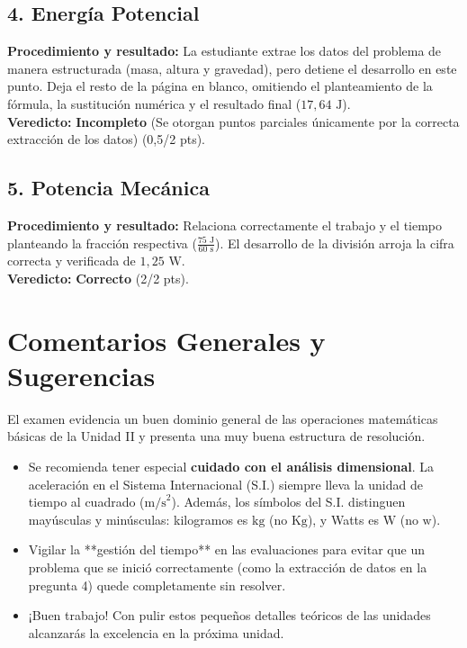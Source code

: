 \documentclass[12pt,letterpaper]{article}
\begin{document}
\subsection*{4. Energía Potencial}
\textbf{Procedimiento y resultado:} La estudiante extrae los datos del problema de manera estructurada (masa, altura y gravedad), pero detiene el desarrollo en este punto. Deja el resto de la página en blanco, omitiendo el planteamiento de la fórmula, la sustitución numérica y el resultado final ($17,64 \text{ J}$). \\
\textbf{Veredicto:} \textbf{Incompleto} (Se otorgan puntos parciales únicamente por la correcta extracción de los datos) (0,5/2 pts).

\subsection*{5. Potencia Mecánica}
\textbf{Procedimiento y resultado:} Relaciona correctamente el trabajo y el tiempo planteando la fracción respectiva ($\frac{75 \text{ J}}{60 \text{ s}}$). El desarrollo de la división arroja la cifra correcta y verificada de $1,25 \text{ W}$. \\
\textbf{Veredicto:} \textbf{Correcto} (2/2 pts).

\vspace{0.5cm}
\section*{Comentarios Generales y Sugerencias}
El examen evidencia un buen dominio general de las operaciones matemáticas básicas de la Unidad II y presenta una muy buena estructura de resolución.
\begin{itemize}
    \item Se recomienda tener especial \textbf{cuidado con el análisis dimensional}. La aceleración en el Sistema Internacional (S.I.) siempre lleva la unidad de tiempo al cuadrado ($\text{m/s}^2$). Además, los símbolos del S.I. distinguen mayúsculas y minúsculas: kilogramos es $\text{kg}$ (no $\text{Kg}$), y Watts es $\text{W}$ (no $\text{w}$).
    \item Vigilar la **gestión del tiempo** en las evaluaciones para evitar que un problema que se inició correctamente (como la extracción de datos en la pregunta 4) quede completamente sin resolver.
    \item ¡Buen trabajo! Con pulir estos pequeños detalles teóricos de las unidades alcanzarás la excelencia en la próxima unidad.
\end{itemize}
\end{document}
